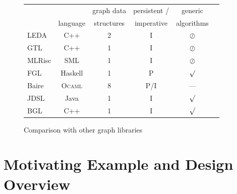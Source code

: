 \documentclass[]{tfp05symp}
\newcommand{\ocamlgraph}{\textsc{Ocamlgraph}\xspace}
\newcommand{\ocaml}{\textsc{Ocaml}\xspace}
\begin{document}
\begin{figure}[t]
\newcommand{\present}{\large\boldmath $\surd$}
\newcommand{\absent}{\large\boldmath $\oslash$}

  \centering
  \begin{tabular}{|l||c|c|c|c|c|}
    \hline
     &          & graph data & persistent / & generic    \\
     & language & structures & imperative   & algorithms \\\hline\hline
     LEDA & C++    & 2  & I & \absent   \\\hline
     GTL & C++     & 1  & I & \absent   \\\hline
     MLRisc & SML  & 1  & I & \absent   \\\hline
     FGL & Haskell & 1  & P & \present  \\\hline
     Baire & \ocaml & 8 &P/I& ---      \\\hline
     JDSL & Java   & 1  & I & \present  \\\hline
     BGL & C++     & 1  & I & \present  \\\hline
  \end{tabular}
  \medskip
  \caption{Comparison with other graph libraries}
  \label{comparison:tab}
\end{figure}

\section{Motivating Example and Design Overview}
\end{document}
